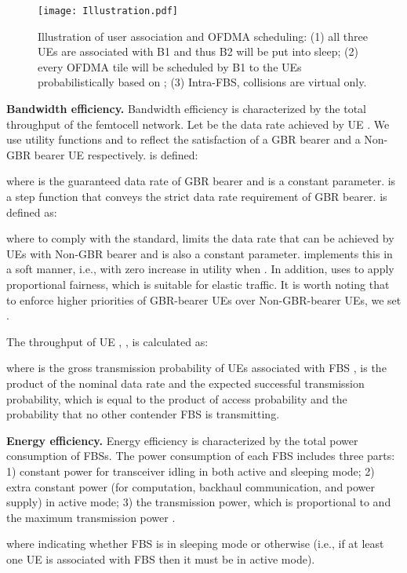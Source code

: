 \documentclass[conference]{IEEEtran}
\begin{document}
\begin{figure}[t]
\centering
\texttt{[image: Illustration.pdf]}
\caption{Illustration of user association and OFDMA scheduling: (1) all three UEs are associated with B1 and thus B2 will be put into sleep; (2) every OFDMA tile will be scheduled by B1 to the UEs probabilistically based on ; (3) Intra-FBS, collisions are virtual only.}
\label{fig:1}
\end{figure}








\noindent\textbf{Bandwidth efficiency.} Bandwidth efficiency is characterized by the total throughput of the femtocell network. Let  be the data rate achieved by UE . We use utility functions  and  to reflect the satisfaction of a GBR bearer and a Non-GBR bearer UE respectively.  is defined:

where  is the guaranteed data rate of GBR bearer and  is a constant parameter.  is a step function that conveys the strict data rate requirement of GBR bearer.  is defined as:

where to comply with the standard,  limits the data rate that can be achieved by UEs with Non-GBR bearer and  is also a constant parameter.  implements this in a soft manner, i.e., with zero increase in utility when . In addition,  uses  to apply proportional fairness, which is suitable for elastic traffic. It is worth noting that to enforce higher priorities of GBR-bearer UEs over Non-GBR-bearer UEs, we set .

The throughput of UE , , is calculated as:

where  is the gross transmission probability of UEs associated with FBS ,  is the product of the nominal data rate  and the expected successful transmission probability, which is equal to the product of access probability  and the probability that no other contender FBS is transmitting. 

\noindent\textbf{Energy efficiency.} Energy efficiency is characterized by the total power consumption of FBSs. The power consumption of each FBS  includes three parts: 1) constant power  for transceiver idling in both active and sleeping mode; 2) extra constant power (for computation, backhaul communication, and power supply)  in active mode; 3) the transmission power, which is proportional to  and the maximum transmission power . 

where  indicating whether FBS  is in sleeping mode or otherwise (i.e., if at least one UE is associated with FBS  then it must be in active mode).
\end{document}
